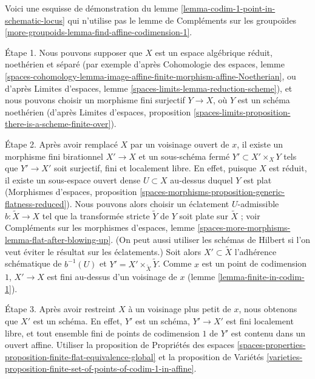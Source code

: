 \begin{remark}
\label{remark-alternate-proof-scheme-codim-1}
Voici une esquisse de démonstration du
lemme \ref{lemma-codim-1-point-in-schematic-locus}
qui n'utilise pas le
lemme de Compléments sur les groupoïdes
\ref{more-groupoids-lemma-find-affine-codimension-1}.

\medskip\noindent
Étape 1. Nous pouvons supposer que $X$ est un espace algébrique réduit,
noethérien et séparé (par exemple d'après Cohomologie des espaces, lemme
\ref{spaces-cohomology-lemma-image-affine-finite-morphism-affine-Noetherian},
ou d'après
Limites d'espaces, lemme \ref{spaces-limits-lemma-reduction-scheme}),
et nous pouvons choisir un morphisme fini surjectif
$Y \to X$, où $Y$ est un schéma noethérien (d'après
Limites d'espaces, proposition
\ref{spaces-limits-proposition-there-is-a-scheme-finite-over}).

\medskip\noindent
Étape 2. Après avoir remplacé $X$ par un voisinage ouvert de $x$, il
existe un morphisme fini birationnel $X' \to X$ et un sous-schéma fermé
$Y' \subset X' \times_X Y$ tels que $Y' \to X'$ soit surjectif,
fini et localement libre. En effet, puisque $X$ est réduit, il existe un
sous-espace ouvert dense $U \subset X$ au-dessus duquel $Y$ est plat (Morphismes d'espaces,
proposition \ref{spaces-morphisms-proposition-generic-flatness-reduced}).
Nous pouvons alors choisir un éclatement $U$-admissible $b : \tilde X \to X$ tel
que la transformée stricte $\tilde Y$ de $Y$ soit plate sur $\tilde X$ ; voir
Compléments sur les morphismes d'espaces, lemme
\ref{spaces-more-morphisms-lemma-flat-after-blowing-up}.
(On peut aussi utiliser les schémas de Hilbert si l'on veut éviter
le résultat sur les éclatements.)
Soit alors $X' \subset \tilde X$ l'adhérence
schématique de $b^{-1}(U)$ et $Y' = X' \times_{\tilde X} \tilde Y$.
Comme $x$ est un point de codimension $1$, $X' \to X$ est fini au-dessus d'un
voisinage de $x$ (lemme \ref{lemma-finite-in-codim-1}).

\medskip\noindent
Étape 3. Après avoir restreint $X$ à un voisinage plus petit de $x$, nous
obtenons que $X'$ est un schéma. En effet, $Y'$ est un schéma, $Y' \to X'$
est fini localement libre, et tout ensemble fini de points de codimension $1$
de $Y'$ est contenu dans un ouvert affine. Utiliser la
proposition de Propriétés des espaces
\ref{spaces-properties-proposition-finite-flat-equivalence-global}
et la
proposition de Variétés
\ref{varieties-proposition-finite-set-of-points-of-codim-1-in-affine}.


\end{remark}
